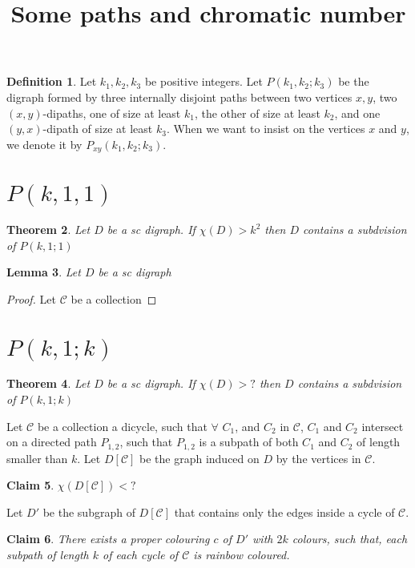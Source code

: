 \documentclass[10pt]{article}
\title{Some paths and chromatic number}
\theoremstyle{plain}
\newtheorem{theorem}{Theorem}
\newtheorem{lemma}[theorem]{Lemma}
\newtheorem{claim}[theorem]{Claim}
\theoremstyle{definition}
\newtheorem{definition}[theorem]{Definition}
\theoremstyle{remark}
\begin{document}
\begin{definition}
Let $k_1,k_2,k_3$ be positive integers. Let $P(k_1,k_2;k_3)$ be the digraph formed by three internally disjoint paths between two vertices $x,y$, two $(x,y)$-dipaths, one of size at least $k_1$, the other of size at least $k_2$, and one $(y,x)$-dipath of size at least $k_3$.
When we want to insist on the vertices $x$ and $y$, we denote it by $P_{xy}(k_1,k_2;k_3)$.
\end{definition}

\section{$P(k,1,1)$}

\begin{theorem}
Let $D$ be a sc digraph. If $\chi(D) > k^2$ then $D$ contains a subdvision of $P(k,1;1)$
\end{theorem}

\begin{lemma}
Let $D$ be a sc digraph
\end{lemma}

\begin{proof}
Let $\mathcal{C}$ be a collection 
\end{proof}


\section{$P(k,1;k)$}

\begin{theorem}
Let $D$ be a sc digraph. If $\chi(D) > ?$ then $D$ contains a subdvision of $P(k,1;k)$
\end{theorem}

Let $\mathcal{C}$ be a collection a dicycle, such that $\forall$ $C_1$, and $C_2$ in $\mathcal{C}$, $C_1$ and $C_2$ intersect on 
a directed path $P_{1,2}$, such that $P_{1,2}$ is a subpath of both $C_1$ and $C_2$ of length smaller than $k$.
Let $D[\mathcal{C}]$ be the graph induced on $D$ by the vertices in $\mathcal{C}$.

\begin{claim}
$\chi(D[\mathcal{C}]) < ? $
\end{claim}

Let $D'$ be the subgraph of $D[\mathcal{C}]$ that contains only the edges inside a cycle of  $\mathcal{C}$.


\begin{claim}
There exists a proper colouring $c$ of $D'$ with $2k$ colours, such that, each subpath of length $k$ of each cycle of $\mathcal{C}$ is rainbow coloured. 
\end{claim}
\end{document}
